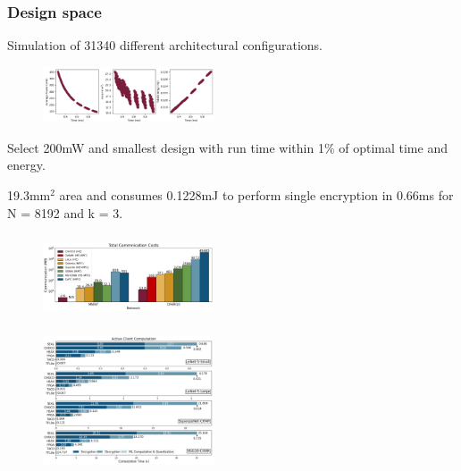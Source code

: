 \documentclass[10pt,handout]{beamer}
\begin{document}


\begin{frame}
\frametitle{Design space}

Simulation of 31340 different architectural configurations.
\begin{figure}
    \includegraphics[width=0.45\textwidth]{design-space.png}
\end{figure}
Select 200mW and smallest design with run time within 1\% of optimal time and energy.

19.3mm$^2$ area and consumes 0.1228mJ to perform single encryption in 0.66ms for N = 8192 and k = 3.
\end{frame}





\begin{frame}
\frametitle{}
\begin{figure}
    \includegraphics[width=0.45\textwidth]{comunication.png}
\end{figure}

\end{frame}



\begin{frame}
    \frametitle{}
    \begin{figure}
    \includegraphics[width=0.45\textwidth]{motivation2.png}
\end{figure}


\end{frame}
\end{document}
